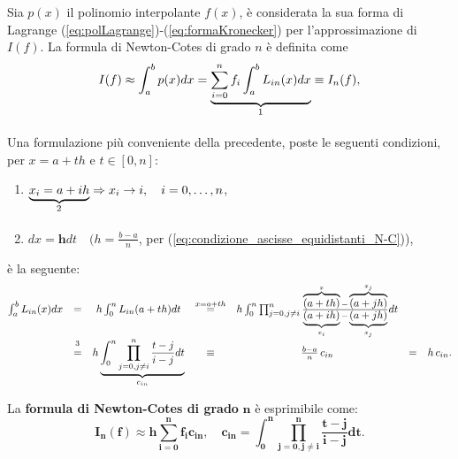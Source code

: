 \begin{definition}
	Sia $p(x)$ il polinomio interpolante $f(x)$, è considerata la sua forma di Lagrange (\ref{eq:polLagrange})-(\ref{eq:formaKronecker}) per l'approssimazione di $I(f)$. La formula di Newton-Cotes di grado $n$ è definita come
	\begin{equation*}
		I(f)\approx \int_a^b p(x)dx=\underbrace{\sum_{i=0}^n f_i\int_a^b L_{in}(x)dx}_{\footnotemark}\equiv I_n(f),
	\end{equation*}
\end{definition}

Una formulazione più conveniente della precedente, poste le seguenti condizioni, per $x=a+th$ e $t\in [0,n]$:
\begin{enumerate}
    \item $\underbrace{x_i=a+ih}_{\footnotemark}\Rightarrow x_i\rightarrow i,\quad i=0,\hdots ,n$,
    \item $dx=\boldsymbol{h}dt\quad (h=\frac{b-a}{n}$, per (\ref{eq:condizione_ascisse_equidistanti_N-C})),
\end{enumerate}
è la seguente:
\begin{equation*}
    \begin{matrix}
        \int_a^b L_{in}(x)dx&=&h\int_0^nL_{in}(a+th)dt&\overset{x=a+th}{=}& h\int_0^n\prod_{j=0,j\neq i}^{n}\frac{\overbrace{(a+th)}^x-\overbrace{(a+jh)}^{x_j}}{\underbrace{(a+ih)}_{x_i}-\underbrace{(a+jh)}_{x_j}}dt\\
        &\overset{\footnotemark}{=}&h\underbrace{\int_0^n\prod_{j=0,j\neq i}^n\frac{t-j}{i-j}dt}_{c_{in}} &\equiv& \frac{b-a}{n}\, c_{in} &=& h\,c_{in}.
    \end{matrix}
\end{equation*}


\begin{definition}
	La \textbf{formula di Newton-Cotes di grado} $\boldsymbol n$ è esprimibile come:
	\begin{equation}\label{eq:formN-C}
	    \boldsymbol{I_n(f)\approx h\sum_{i=0}^n f_ic_{in}},\quad \boldsymbol{c_{in}=\int_0^n\prod_{j=0, j\neq i}^n \frac{t-j}{i-j}dt.}
	\end{equation}
\end{definition}

